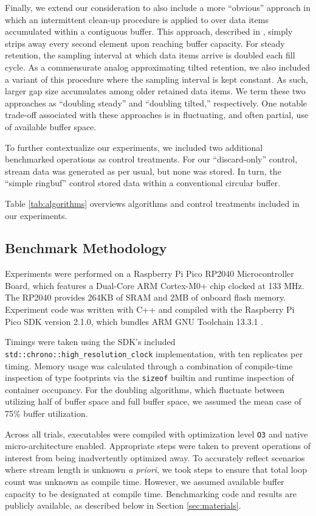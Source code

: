 Finally, we extend our consideration to also include a more ``obvious'' approach in which an intermittent clean-up procedure is applied to over data items accumulated within a contiguous buffer.
This approach, described in \citet{gunther2014algorithm}, simply strips away every second element upon reaching buffer capacity.
For steady retention, the sampling interval at which data items arrive is doubled each fill cycle.
As a commensurate analog approximating tilted retention, we  also included a variant of this procedure where the sampling interval is kept constant.
As such, larger gap size accumulates among older retained data items.
We term these two approaches as ``doubling steady'' and ``doubling tilted,'' respectively.
One notable trade-off associated with these approaches is in fluctuating, and often partial, use of available buffer space.

To further contextualize our experiments, we included two additional benchmarked operations as control treatments.
For our ``discard-only'' control, stream data was generated as per usual, but none was stored.
In turn, the ``simple ringbuf'' control stored data within a conventional circular buffer.

Table \ref{tab:algorithms} overviews algorithms and control treatments included in our experiments.

\subsection{Benchmark Methodology}

Experiments were performed on a Raspberry Pi Pico RP2040 Microcontroller Board, which features a Dual-Core ARM Cortex-M0+ chip clocked at 133 MHz.
The RP2040 provides 264KB of SRAM and 2MB of onboard flash memory.
Experiment code was written with C++ and compiled with the Raspberry Pi Pico SDK version 2.1.0, which bundles ARM GNU Toolchain 13.3.1 \citep{raspberrypipico2024}.

Timings were taken using the SDK's included \texttt{std::chrono::high\_resolution\_clock} implementation, with ten replicates per timing.
Memory usage was calculated through a combination of compile-time inspection of type footprints via the \texttt{sizeof} builtin and runtime inspection of container occupancy.
For the doubling algorithms, which fluctuate between utilizing half of buffer space and full buffer space, we assumed the mean case of 75\% buffer utilization.

Across all trials, executables were compiled with optimization level \texttt{O3} and native micro-architecture enabled.
Appropriate steps were taken to prevent operations of interest from being inadvertently optimized away.
To accurately reflect scenarios where stream length is unknown \textit{a priori}, we took steps to ensure that total loop count was unknown as compile time.
However, we assumed available buffer capacity to be designated at compile time.
Benchmarking code and results are publicly available, as described below in Section \ref{sec:materials}.

